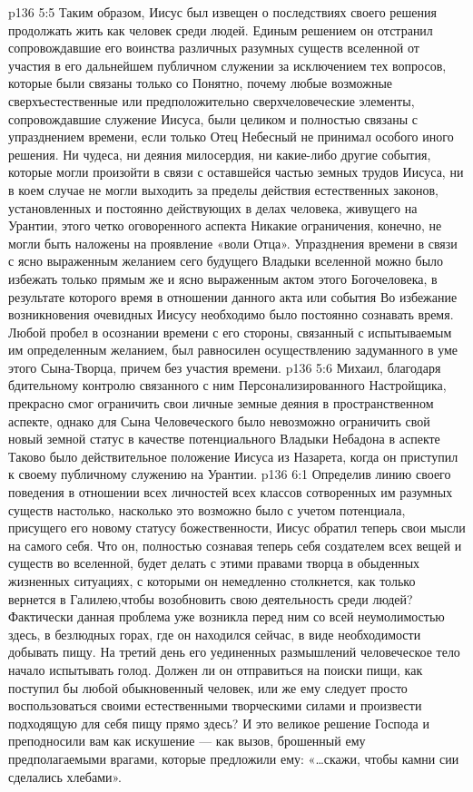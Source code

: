 \vs p136 5:5 \pc Таким образом, Иисус был извещен о последствиях своего решения продолжать жить как человек среди людей. Единым решением он отстранил сопровождавшие его воинства различных разумных существ вселенной от участия в его дальнейшем публичном служении за исключением тех вопросов, которые были связаны только со  Понятно, почему любые возможные сверхъестественные или предположительно сверхчеловеческие элементы, сопровождавшие служение Иисуса, были целиком и полностью связаны с упразднением времени, если только Отец Небесный не принимал особого иного решения. Ни чудеса, ни деяния милосердия, ни какие\hyp{}либо другие события, которые могли произойти в связи с оставшейся частью земных трудов Иисуса, ни в коем случае не могли выходить за пределы действия естественных законов, установленных и постоянно действующих в делах человека, живущего на Урантии,  этого четко оговоренного аспекта  Никакие ограничения, конечно, не могли быть наложены на проявление «воли Отца». Упразднения времени в связи с ясно выраженным желанием сего будущего Владыки вселенной можно было избежать только прямым же и ясно выраженным актом  этого Богочеловека, в результате которого время в отношении данного акта или события  Во избежание возникновения очевидных  Иисусу необходимо было постоянно сознавать время. Любой пробел в осознании времени с его стороны, связанный с испытываемым им определенным желанием, был равносилен осуществлению задуманного в уме этого Сына\hyp{}Творца, причем без участия времени.
\vs p136 5:6 Михаил, благодаря бдительному контролю связанного с ним Персонализированного Настройщика, прекрасно смог ограничить свои личные земные деяния в пространственном аспекте, однако для Сына Человеческого было невозможно ограничить свой новый земной статус в качестве потенциального Владыки Небадона в аспекте  Таково было действительное положение Иисуса из Назарета, когда он приступил к своему публичному служению на Урантии.
\vs p136 6:1 Определив линию своего поведения в отношении всех личностей всех классов сотворенных им разумных существ настолько, насколько это возможно было с учетом потенциала, присущего его новому статусу божественности, Иисус обратил теперь свои мысли на самого себя. Что он, полностью сознавая теперь себя создателем всех вещей и существ во вселенной, будет делать с этими правами творца в обыденных жизненных ситуациях, с которыми он немедленно столкнется, как только вернется в Галилею,чтобы возобновить свою деятельность среди людей? Фактически данная проблема уже возникла перед ним со всей неумолимостью здесь, в безлюдных горах, где он находился сейчас, в виде необходимости добывать пищу. На третий день его уединенных размышлений человеческое тело начало испытывать голод. Должен ли он отправиться на поиски пищи, как поступил бы любой обыкновенный человек, или же ему следует просто воспользоваться своими естественными творческими силами и произвести подходящую для себя пищу прямо здесь? И это великое решение Господа и преподносили вам как искушение --- как вызов, брошенный ему предполагаемыми врагами, которые предложили ему: «\ldots скажи, чтобы камни сии сделались хлебами».
